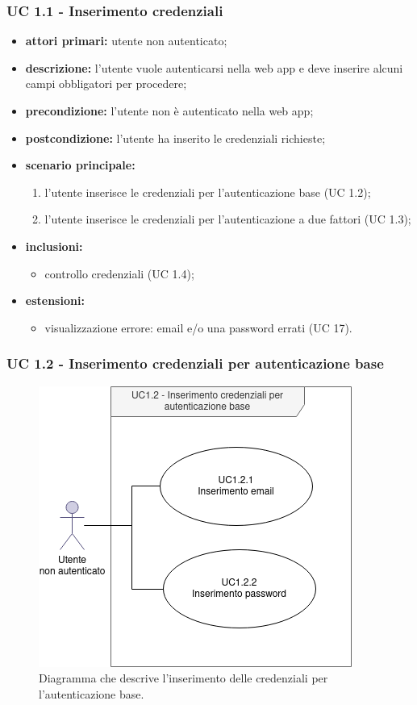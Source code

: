 		\subsubsection{UC 1.1 - Inserimento credenziali}

		\begin{itemize}
			\item \textbf{attori primari:} utente non autenticato;
			\item \textbf{descrizione:} l'utente vuole autenticarsi nella web app e deve inserire alcuni campi obbligatori per procedere;
			\item \textbf{precondizione:} l'utente non è autenticato nella web app;
			\item \textbf{postcondizione:} l'utente ha inserito le credenziali richieste;
			\item \textbf{scenario principale:}
			\begin{enumerate}
				\item l'utente inserisce le credenziali per l'autenticazione base (UC 1.2);
				\item l'utente inserisce le credenziali per l'autenticazione a due fattori (UC 1.3);
			\end{enumerate}
			\item \textbf{inclusioni:}
				\begin{itemize}
					\item controllo credenziali (UC 1.4);
				\end{itemize}
			\item \textbf{estensioni:}
				\begin{itemize}
					\item visualizzazione errore: email e/o una password errati (UC 17).
				\end{itemize}
		\end{itemize}

		\subsubsection{UC 1.2 - Inserimento credenziali per autenticazione base}

		\begin{figure}[H]
			\centering
			\includegraphics[scale=0.675]{res/images/uc1.2}
			\caption{Diagramma che descrive l'inserimento delle credenziali per l'autenticazione base.}
		\end{figure}

